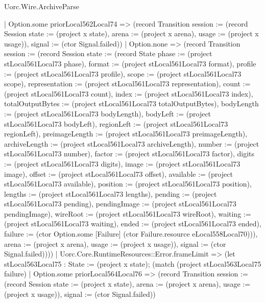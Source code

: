 \begin{lexlean}{Uorc.Wire.ArchiveParse}
\begin{semanticmodule}
{        | Option.some priorLocal562Local74 => (record Transition {session := (record Session {state := (project x state), arena := (project x arena), usage := (project x usage)}), signal := (ctor Signal.failed)})
        | Option.none => (record Transition {session := (record Session {state := (record State {phase := (project stLocal561Local73 phase), format := (project stLocal561Local73 format), profile := (project stLocal561Local73 profile), scope := (project stLocal561Local73 scope), representation := (project stLocal561Local73 representation), count := (project stLocal561Local73 count), index := (project stLocal561Local73 index), totalOutputBytes := (project stLocal561Local73 totalOutputBytes), bodyLength := (project stLocal561Local73 bodyLength), bodyLeft := (project stLocal561Local73 bodyLeft), regionLeft := (project stLocal561Local73 regionLeft), preimageLength := (project stLocal561Local73 preimageLength), archiveLength := (project stLocal561Local73 archiveLength), number := (project stLocal561Local73 number), factor := (project stLocal561Local73 factor), digits := (project stLocal561Local73 digits), image := (project stLocal561Local73 image), offset := (project stLocal561Local73 offset), available := (project stLocal561Local73 available), position := (project stLocal561Local73 position), lengths := (project stLocal561Local73 lengths), pending := (project stLocal561Local73 pending), pendingImage := (project stLocal561Local73 pendingImage), wireRoot := (project stLocal561Local73 wireRoot), waiting := (project stLocal561Local73 waiting), ended := (project stLocal561Local73 ended), failure := (ctor Option.some [Failure] (ctor Failure.resource eLocal558Local70))}), arena := (project x arena), usage := (project x usage)}), signal := (ctor Signal.failed)})))
      | Uorc.Core.RuntimeResources::Error.frameLimit => (let stLocal563Local75 : State := (project x state); (match (project stLocal563Local75 failure)
        | Option.some priorLocal564Local76 => (record Transition {session := (record Session {state := (project x state), arena := (project x arena), usage := (project x usage)}), signal := (ctor Signal.failed)})
}
\end{semanticmodule}
\end{lexlean}
